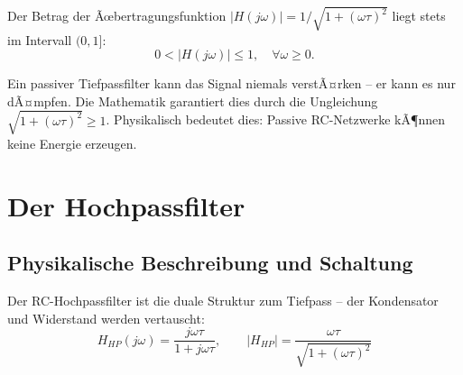 ﻿\documentclass[12pt, a4paper]{article}
\begin{document}
	Der Betrag der Ãœbertragungsfunktion $|H(j\omega)| = 1/\sqrt{1+(\omega\tau)^2}$ liegt stets im Intervall $(0,1]$:
	\begin{equation}
		0 < |H(j\omega)| \leq 1, \quad \forall \omega \geq 0.
	\end{equation}
	
	Ein passiver Tiefpassfilter kann das Signal niemals verstÃ¤rken -- er kann es nur dÃ¤mpfen. Die Mathematik garantiert dies durch die Ungleichung $\sqrt{1+(\omega\tau)^2} \geq 1$. Physikalisch bedeutet dies: Passive RC-Netzwerke kÃ¶nnen keine Energie erzeugen.
	
	\section{Der Hochpassfilter}
	
	\subsection{Physikalische Beschreibung und Schaltung}
	
	Der RC-Hochpassfilter ist die duale Struktur zum Tiefpass -- der Kondensator und Widerstand werden vertauscht:
	\begin{equation}
		H_{HP}(j\omega) = \frac{j\omega\tau}{1 + j\omega\tau}, \qquad |H_{HP}| = \frac{\omega\tau}{\sqrt{1+(\omega\tau)^2}}
	\end{equation}
	
\end{document}
